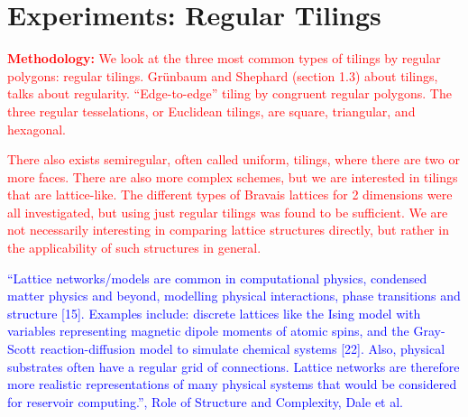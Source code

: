 \chapter{Experiments: Regular Tilings}



\textcolor{red}{
  \textbf{Methodology:} We look at the three most common types of tilings by
regular polygons: regular tilings. Grünbaum and Shephard (section 1.3) about
tilings, talks about regularity. ``Edge-to-edge'' tiling by congruent regular
polygons. The three regular tesselations, or Euclidean tilings, are square,
triangular, and hexagonal.
}

\textcolor{red}{
  There also exists semiregular, often called uniform, tilings, where there are
two or more faces. There are also more complex schemes, but we are interested in
tilings that are lattice-like. The different types of Bravais lattices for 2
dimensions were all investigated, but using just regular tilings was found to be
sufficient. We are not necessarily interesting in comparing lattice structures
directly, but rather in the applicability of such structures in general.
}

\textcolor{blue}{
  ``Lattice networks/models are common in computational physics, condensed
matter physics and beyond, modelling physical interactions, phase transitions
and structure [15]. Examples include: discrete lattices like the Ising model
with variables representing magnetic dipole moments of atomic spins, and the
Gray- Scott reaction-diffusion model to simulate chemical systems [22]. Also,
physical substrates often have a regular grid of connections. Lattice networks
are therefore more realistic representations of many physical systems that would
be considered for reservoir computing.'', Role of Structure and Complexity, Dale
et al.
}

